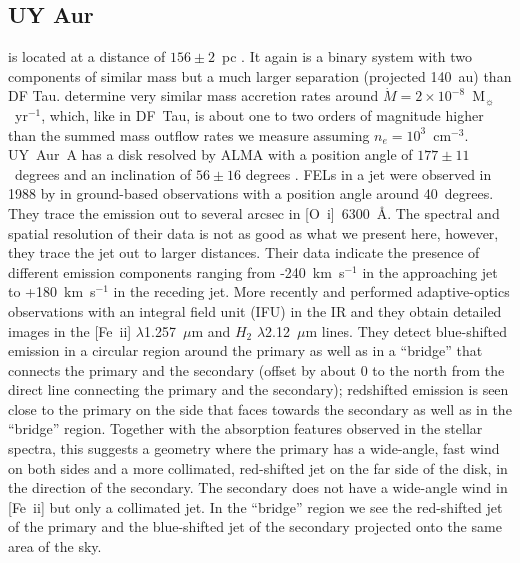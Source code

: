 \documentclass[twocolumn,trackchanges]{aastex63}
\begin{document}
\subsection{UY Aur}
\label{sect:discussion:UYAur}
 is located at a distance of $156\pm2$~pc
\citep{2016A&A...595A...1G,2018A&A...616A...1G}. It again is a binary system
with two components of similar mass \citep[M0 and M2,
  see][]{2003ApJ...583..334H} but a much larger separation (projected 140~au)
than DF Tau. \citet{2003ApJ...583..334H} determine very similar mass accretion
rates around $\dot M=2\times10^{-8}$~M$_{\sun}$~yr$^{-1}$, which, like in
DF~Tau, is about one to two orders of magnitude higher than the summed mass
outflow rates we measure assuming $n_e=10^3$~cm$^{-3}$.  UY~Aur~A has a disk
resolved by ALMA with a position angle of $177\pm11$~degrees and an inclination
of $56\pm16$ degrees \citep{2014ApJ...784...62A}. FELs in a jet were observed
in 1988 by \citet{1997A&AS..126..437H} in ground-based observations with a
position angle around 40~degrees. They trace the emission out to several arcsec
in [O~{\sc i}]~6300~\AA{}. The spectral and spatial resolution of their data is
not as good as what we present here, however, they trace the jet out to larger
distances. Their data indicate the presence of different emission components
ranging from -240~km~s$^{-1}$ in the approaching jet to +180~km~s$^{-1}$ in the
receding jet. More recently \citet{2014ApJ...786...63P} and
\citet{2019ApJ...884..159B} performed adaptive-optics observations with an
integral field unit (IFU) in the IR and they obtain detailed images in the
[Fe~{\sc ii}] $\lambda$1.257~$\mu$m and $H_2$ $\lambda$2.12~$\mu$m
  lines. They detect blue-shifted emission in a circular region around the
primary as well as in a ``bridge'' that connects the primary and the secondary
(offset by about 0 to the north from the direct line connecting the
primary and the secondary); redshifted emission is seen close to the primary on
the side that faces towards the secondary as well as in the ``bridge''
region. Together with the absorption features observed in the stellar spectra,
this suggests a geometry where the primary has a wide-angle, fast wind on both
sides and a more collimated, red-shifted jet on the far side of the disk, in
the direction of the secondary. The secondary does not have a wide-angle wind
in [Fe~{\sc ii}] but only a collimated jet. In the ``bridge'' region we see the
red-shifted jet of the primary and the blue-shifted jet of the secondary
projected onto the same area of the sky.
\end{document}
